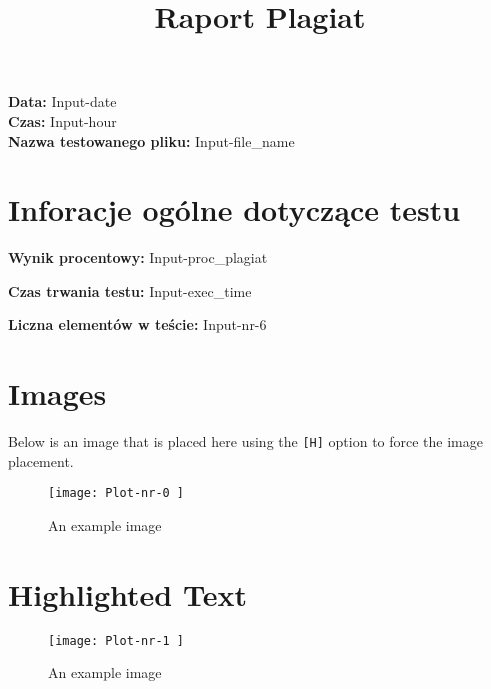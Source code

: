 \documentclass{article}
\title{Raport Plagiat}
\date{}
\begin{document}
\maketitle

\begin{center}
    \textbf{Data:} Input-date \\
    \textbf{Czas:} Input-hour \\
    \textbf{Nazwa testowanego pliku:} Input-file_name
\end{center}

\section{Inforacje ogólne dotyczące testu}

\textbf{Wynik procentowy:} Input-proc_plagiat

\textbf{Czas trwania testu:} Input-exec_time

\textbf{Liczna elementów w teście:} Input-nr-6


\section{Images}

Below is an image that is placed here using the \texttt{[H]} option to force the image placement.

\begin{figure}[H]
\centering
\texttt{[image:  Plot-nr-0 ]}
\caption{An example image}
\end{figure}

\section{Highlighted Text}

\begin{figure}[H]
\centering
\texttt{[image:  Plot-nr-1 ]}
\caption{An example image}
\end{figure}
\end{document}
